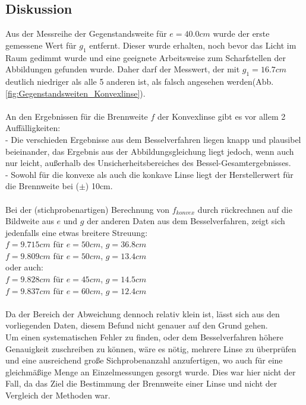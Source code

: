\documentclass[12pt,a4paper]{article}
\begin{document}
\begin{multicols}{2}


\subsection{Diskussion}
Aus der Messreihe der Gegenstandsweite für $e=40.0cm$ wurde der erste gemessene Wert für $g_1$ entfernt. Dieser wurde erhalten, noch bevor das Licht im Raum gedimmt wurde und eine geeignete Arbeitsweise zum Scharfstellen der Abbildungen gefunden wurde. Daher darf der Messwert, der mit $g_1 = 16.7 cm$ deutlich niedriger als alle 5 anderen ist, als falsch angesehen werden(Abb. \ref{fig:Gegenstandsweiten_Konvexlinse}).\\
\\
An den Ergebnissen für die Brennweite $f$ der Konvexlinse gibt es vor allem 2 Auffälligkeiten:\\
- Die verschieden Ergebnisse aus dem Besselverfahren liegen knapp und plausibel beieinander, das Ergebnis aus der Abbildungsgleichung liegt jedoch, wenn auch nur leicht, außerhalb des Unsicherheitsbereiches des Bessel-Gesamtergebnisses.\\
- Sowohl für die konvexe als auch die konkave Linse liegt der Herstellerwert für die Brennweite bei ($\pm$) 10cm.\\
\\
Bei der (stichprobenartigen) Berechnung von $f_{konvex}$ durch rückrechnen auf die Bildweite aus $e$ und $g$ der anderen Daten aus dem Besselverfahren, zeigt sich jedenfalls eine etwas breitere Streuung:\\
$f = 9.715cm$ für $e=50cm$, $g=36.8cm$\\
$f=9.809cm$ für $e=50cm$, $g=13.4cm$\\
oder auch:\\
$f=9.828cm$ für $e=45cm$, $g=14.5cm$\\
$f=9.837cm$ für $e=60cm$, $g=12.4cm$\\
\\
Da der Bereich der Abweichung dennoch relativ klein ist, lässt sich aus den vorliegenden Daten, diesem Befund nicht genauer auf den Grund gehen.\\
Um einen systematischen Fehler zu finden, oder dem Besselverfahren höhere Genauigkeit zuschreiben zu können, wäre es nötig, mehrere Linse zu überprüfen und eine ausreichend große Sichprobenanzahl anzufertigen, wo auch für eine gleichmäßige Menge an Einzelmessungen gesorgt wurde. Dies war hier nicht der Fall, da das Ziel die Bestimmung der Brennweite einer Linse und nicht der Vergleich der Methoden war.\\

\end{multicols}
\end{document}
